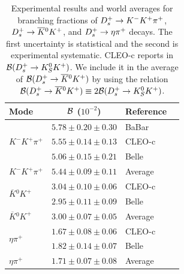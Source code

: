 \begin{table}[t!]
\caption{Experimental results and world averages for branching fractions of $D_{s}^+\to K^-K^+\pi^+$, $D_{s}^+\to \overline{K}{}^0K^+$, and
$D_{s}^+\to \eta\pi^+$ decays. The first uncertainty is statistical and the second is experimental systematic. CLEO-c reports in \cite{Onyisi:2013bjt}
${\cal B}(D_{s}^+\to K^0_SK^+)$. We include it in the average of ${\cal B}(D_{s}^+\to \overline{K}{}^0K^+)$ by using the relation ${\cal B}(D_{s}^+\to \overline{K}{}^0K^+)\equiv 2{\cal B}(D_{s}^+\to K^0_SK^+)$.
\label{tab:DSExpHadronic}}
\begin{center}
\begin{tabular}{lcll}
\toprule
\rowcolor{gray} Mode 	& ${\cal{B}}$ ($10^{-2}$)				& Reference 	& \\ 
\midrule
\multirow{3}{*}{$K^-K^+\pi^+$}  & $5.78\pm0.20\pm 0.30$ 		& BaBar		& \cite{delAmoSanchez:2010jg}\\ 
						& $5.55\pm0.14\pm 0.13$ 		& CLEO-c		& \cite{Onyisi:2013bjt}\\ 
						& $5.06\pm0.15\pm 0.21$ 		& Belle   		& \cite{Zupanc:2013byn}\\
\midrule
\rowcolor{gray}$K^-K^+\pi^+$	& $5.44\pm0.09\pm 0.11$			& Average & \\
\midrule
\multirow{2}{*}{$\overline{K}{}^0K^+$}		& $3.04\pm0.10\pm 0.06$ 		& CLEO-c		& \cite{Onyisi:2013bjt}\\ 
								& $2.95\pm0.11\pm 0.09$ 		& Belle   		& \cite{Zupanc:2013byn}\\
\midrule
\rowcolor{gray}$\overline{K}{}^0K^+$		& $3.00\pm0.07\pm 0.05$			& Average & \\
\midrule
\multirow{2}{*}{$\eta\pi^+$}  	& $1.67\pm0.08\pm 0.06$ 		& CLEO-c		& \cite{Onyisi:2013bjt}\\ 
						& $1.82\pm0.14\pm 0.07$ 		& Belle   		& \cite{Zupanc:2013byn}\\
\midrule
\rowcolor{gray}$\eta\pi^+$	& $1.71\pm0.07\pm 0.08$			& Average & 
\\ \bottomrule
\end{tabular}
\end{center}
\end{table}

